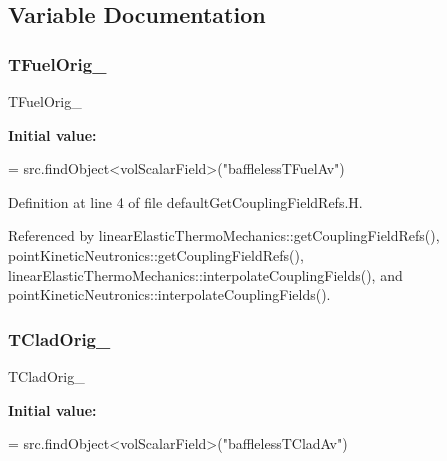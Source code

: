 \subsection{Variable Documentation}
\mbox{\label{defaultGetCouplingFieldRefs_8H_af402ab4d8e2e8152ef35ec58ecf63a2a}} 
\subsubsection{\texorpdfstring{T\+Fuel\+Orig\+\_\+}{TFuelOrig\_}}
{\footnotesize\ttfamily T\+Fuel\+Orig\+\_\+}

{\bfseries Initial value\+:}
\begin{DoxyCode}
= 
    src.findObject<volScalarField>(\textcolor{stringliteral}{"bafflelessTFuelAv"})
\end{DoxyCode}


Definition at line 4 of file default\+Get\+Coupling\+Field\+Refs.\+H.



Referenced by linear\+Elastic\+Thermo\+Mechanics\+::get\+Coupling\+Field\+Refs(), point\+Kinetic\+Neutronics\+::get\+Coupling\+Field\+Refs(), linear\+Elastic\+Thermo\+Mechanics\+::interpolate\+Coupling\+Fields(), and point\+Kinetic\+Neutronics\+::interpolate\+Coupling\+Fields().

\mbox{\label{defaultGetCouplingFieldRefs_8H_a73c38fe5cf4a4b0eba8741ffd6a846c9}} 
\subsubsection{\texorpdfstring{T\+Clad\+Orig\+\_\+}{TCladOrig\_}}
{\footnotesize\ttfamily T\+Clad\+Orig\+\_\+}

{\bfseries Initial value\+:}
\begin{DoxyCode}
= 
    src.findObject<volScalarField>(\textcolor{stringliteral}{"bafflelessTCladAv"})
\end{DoxyCode}



